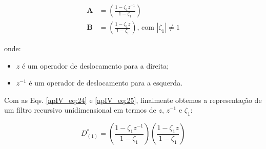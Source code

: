 

\begin{align}
\label{apIV_eq:24}
\mathbf{A} & = \left( \frac{1 - \zeta_{1}z^{-1}}{1 - \zeta_{1}} \right) \\
\label{apIV_eq:25}
\mathbf{B} & = \left( \frac{1 - \zeta_{1}z}{1 - \zeta_{1}} \right) \text{, com $|\zeta_{1}| \neq 1$}
\end{align}

onde:

\begin{itemize}
	\item $z$ é um operador de deslocamento para a direita;
	\item $z^{-1}$ é um operador de deslocamento para a esquerda.
\end{itemize}

Com as Eqs. \ref{apIV_eq:24} e \ref{apIV_eq:25}, finalmente obtemos a representação de um filtro recursivo unidimensional em termos de $z$, $z^{-1}$ e $\zeta_{1}$:

\begin{equation}
\label{apIV_eq:27}
D^{*}_{(1)} = \left( \frac{1 - \zeta_{1}z^{-1}}{1 - \zeta_{1}}  \right) \left( \frac{1 - \zeta_{1}z}{1 - \zeta_{1}}  \right)
\end{equation}